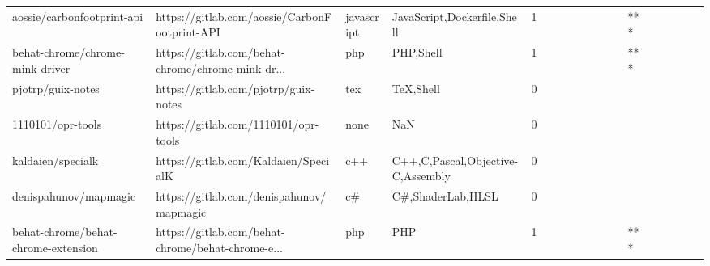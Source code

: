 \begin{tabular}{llllrlllllllllllll}
aossie/carbonfootprint-api                         &      https://gitlab.com/aossie/CarbonFootprint-API &        javascript &                        JavaScript,Dockerfile,Shell &       1 &         &        &           &                &                 &        &           &       *** &          &          &       &              &          \\
behat-chrome/chrome-mink-driver                    &  https://gitlab.com/behat-chrome/chrome-mink-dr... &               php &                                          PHP,Shell &       1 &         &        &           &                &                 &        &           &       *** &          &          &       &              &          \\
pjotrp/guix-notes                                  &               https://gitlab.com/pjotrp/guix-notes &               tex &                                          TeX,Shell &       0 &         &        &           &                &                 &        &           &           &          &          &       &              &          \\
1110101/opr-tools                                  &               https://gitlab.com/1110101/opr-tools &              none &                                                NaN &       0 &         &        &           &                &                 &        &           &           &          &          &       &              &          \\
kaldaien/specialk                                  &               https://gitlab.com/Kaldaien/SpecialK &               c++ &                  C++,C,Pascal,Objective-C,Assembly &       0 &         &        &           &                &                 &        &           &           &          &          &       &              &          \\
denispahunov/mapmagic                              &           https://gitlab.com/denispahunov/mapmagic &                c\# &                                  C\#,ShaderLab,HLSL &       0 &         &        &           &                &                 &        &           &           &          &          &       &              &          \\
behat-chrome/behat-chrome-extension                &  https://gitlab.com/behat-chrome/behat-chrome-e... &               php &                                                PHP &       1 &         &        &           &                &                 &        &           &       *** &          &          &       &              &          \\

\end{tabular}
